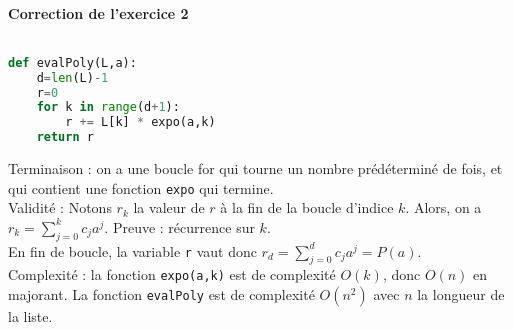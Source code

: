 \documentclass[11pt,a4paper]{article}
\begin{document}
\paragraph{Correction de l'exercice 2 }$ $

\begin{lstlisting}[language=Python]
def evalPoly(L,a):
	d=len(L)-1
	r=0
	for k in range(d+1):
		r += L[k] * expo(a,k)
	return r
\end{lstlisting}
Terminaison : on a une boucle for qui tourne un nombre prédéterminé de fois, et qui contient une fonction \verb+expo+ qui termine.\\

Validité : Notons $r_k$ la valeur de $r$ à la fin de la boucle d'indice $k$.
Alors, on a $r_k = \sum_{j=0}^k c_ja^j$. Preuve : récurrence sur $k$.\\
En fin de boucle, la variable \verb+r+ vaut donc $r_d = \sum_{j=0}^d c_ja^j = P(a)$.\\

Complexité : la fonction \verb+expo(a,k)+ est de complexité $O(k)$, donc $O(n)$ en majorant.
La fonction \verb+evalPoly+ est de complexité $O(n^2)$ avec $n$ la longueur de la liste.\\
\end{document}
